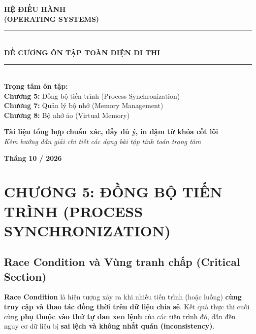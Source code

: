 \documentclass[11pt,a4paper]{article}
\begin{document}
\begin{titlepage}
    \centering
    \vspace*{1.5cm}
    
    {\Huge \bfseries HỆ ĐIỀU HÀNH}\\[0.5cm]
    {\LARGE \bfseries (OPERATING SYSTEMS)}\\[1.5cm]
    
    \rule{\linewidth}{1.5pt}\\[0.4cm]
    {\huge \bfseries ĐỀ CƯƠNG ÔN TẬP TOÀN DIỆN ĐI THI}\\[0.2cm]
    \rule{\linewidth}{1.5pt}\\[1.5cm]
    
    \textbf{\Large Trọng tâm ôn tập:}\\[0.3cm]
    \large
    \textbf{Chương 5:} Đồng bộ tiến trình (Process Synchronization)\\
    \textbf{Chương 7:} Quản lý bộ nhớ (Memory Management)\\
    \textbf{Chương 8:} Bộ nhớ ảo (Virtual Memory)\\[2cm]
    
    \begin{tcolorbox}[colback=blue!5!white,colframe=blue!75!black,width=0.85\linewidth,arc=2mm]
    \centering
    \textbf{Tài liệu tổng hợp chuẩn xác, đầy đủ ý, in đậm từ khóa cốt lõi}\\
    \textit{Kèm hướng dẫn giải chi tiết các dạng bài tập tính toán trọng tâm}
    \end{tcolorbox}
    
    \vfill
    {\large \textbf{Tháng 10 / 2026}}
\end{titlepage}

\tableofcontents
\newpage

\section{CHƯƠNG 5: ĐỒNG BỘ TIẾN TRÌNH (PROCESS SYNCHRONIZATION)}

\subsection{Race Condition và Vùng tranh chấp (Critical Section)}

\begin{summarybox}
\textbf{Race Condition} là hiện tượng xảy ra khi nhiều tiến trình (hoặc luồng) \textbf{cùng truy cập và thao tác đồng thời trên dữ liệu chia sẻ}. Kết quả thực thi cuối cùng \textbf{phụ thuộc vào thứ tự đan xen lệnh} của các tiến trình đó, dẫn đến nguy cơ dữ liệu bị \textbf{sai lệch và không nhất quán (inconsistency)}.
\end{summarybox}
\end{document}
